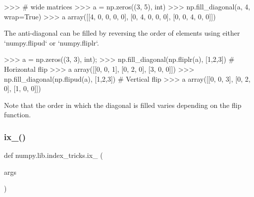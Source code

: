 \begin{DoxyVerb}
>>> # wide matrices
>>> a = np.zeros((3, 5), int)
>>> np.fill_diagonal(a, 4, wrap=True)
>>> a
array([[4, 0, 0, 0, 0],
       [0, 4, 0, 0, 0],
       [0, 0, 4, 0, 0]])

The anti-diagonal can be filled by reversing the order of elements
using either `numpy.flipud` or `numpy.fliplr`.

>>> a = np.zeros((3, 3), int);
>>> np.fill_diagonal(np.fliplr(a), [1,2,3])  # Horizontal flip
>>> a
array([[0, 0, 1],
       [0, 2, 0],
       [3, 0, 0]])
>>> np.fill_diagonal(np.flipud(a), [1,2,3])  # Vertical flip
>>> a
array([[0, 0, 3],
       [0, 2, 0],
       [1, 0, 0]])

Note that the order in which the diagonal is filled varies depending
on the flip function.
\end{DoxyVerb}
 \mbox{\label{namespacenumpy_1_1lib_1_1index__tricks_ac7efd051779676e13d5806315e7aa940}} 
\subsubsection{\texorpdfstring{ix\+\_\+()}{ix\_()}}
{\footnotesize\ttfamily def numpy.\+lib.\+index\+\_\+tricks.\+ix\+\_\+ (\begin{DoxyParamCaption}\item[{}]{args }\end{DoxyParamCaption})}

